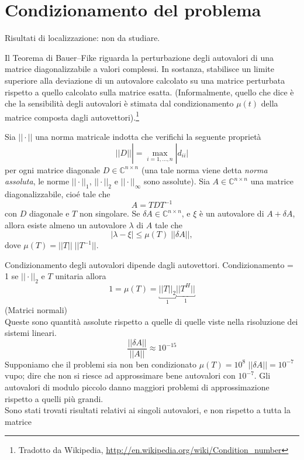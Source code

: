 \section{Condizionamento del problema}
\begin{notes}
Risultati di localizzazione: non da studiare.
\end{notes}
Il Teorema di Bauer--Fike riguarda la perturbazione degli autovalori di una matrice diagonalizzabile a valori complessi. In sostanza, stabilisce un limite superiore alla deviazione di un autovalore calcolato su una matrice perturbata rispetto a quello calcolato sulla matrice esatta. (Informalmente, quello che dice è che la sensibilità degli autovalori è stimata dal condizionamento $\mu(t)$ della matrice composta dagli autovettori).\footnote{Tradotto da Wikipedia, \url{http://en.wikipedia.org/wiki/Condition_number}} 

\begin{theo}
 Sia $ || \cdot ||$ una norma matricale indotta che verifichi la seguente
 propriet\`a
 $$ || D||| = \displaystyle \max_{i=1, \ldots, n} |d_{ii}|$$
per ogni matrice diagonale $D \in \mathbb{C}^{n \times n}$
 (una tale norma viene detta \emph{norma assoluta},
 le norme $||\cdot||_{1}$, $ || \cdot ||_{2}$ e $|| \cdot ||_{\infty}  $
sono assolute). Sia $A \in \mathbb{C}^{n \times n}$
 una matrice diagonalizzabile, cio\'e tale che
 $$ A = TDT^{-1}$$
con $D$ diagonale e $T$ non singolare. 
Se $\delta A \in \mathbb{C}^{n \times n}$,
 e $\xi$ \`e  un autovalore di
$A + \delta A$, allora esiste almeno un autovalore $\lambda$ di $A$ tale che
$$ | \lambda - \xi | \leq \mu(T) \; || \delta A||,$$
dove $\mu(T) = ||T|| \; ||T^{-1}||$.
\end{theo}

Condizionamento degli autovalori dipende dagli autovettori.
Condizionamento = 1 se $|| \cdot ||_2$ e $T$ unitaria
allora
$$ 1 = \mu(T) = \underbracket{||T||_{2}}_{1} \underbracket{||T^{H}||}_{1}$$
(Matrici normali) \\
Queste sono quantit\`a assolute rispetto a quelle di
quelle viste nella risoluzione dei sistemi lineari.
$$
\dfrac{||\delta A||}{||A||} \approx 10^{-15}
$$
Supponiamo che il problemi sia non ben condizionato
$\mu(T) = 10^8$ $||\delta A || =10^{-7}$
vupo; dire che non si riesce ad approssimare bene
autovalori con $10^{-7}$. Gli autovalori di modulo
 piccolo danno maggiori problemi di approssimazione
rispetto a quelli pi\`u grandi.  \\
Sono stati trovati risultati relativi ai singoli autovalori,
e non rispetto a tutta la matrice

